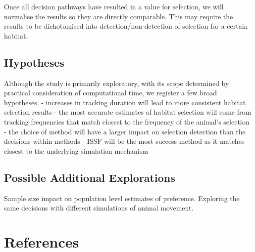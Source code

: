 \documentclass[10pt,a4paper]{article}
\begin{document}
Once all decision pathways have resulted in a value for selection, we will normalise the results so they are directly comparable.
This may require the results to be dichotomised into detection/non-detection of selection for a certain habitat.

\hypertarget{hypotheses}{%
\subsection{Hypotheses}\label{hypotheses}}

Although the study is primarily exploratory, with its scope determined by practical consideration of computational time, we register a few broad hypotheses.
- increases in tracking duration will lead to more consistent habitat selection results
- the most accurate estimates of habitat selection will come from tracking frequencies that match closest to the frequency of the animal's selection
- the choice of method will have a larger impact on selection detection than the decisions within methods
- ISSF will be the most success method as it matches closest to the underlying simulation mechanism

\hypertarget{possible-additional-explorations}{%
\subsection{Possible Additional Explorations}\label{possible-additional-explorations}}

Sample size impact on population level estimates of preference.
Exploring the same decisions with different simulations of animal movement.

\hypertarget{references}{%
\section*{References}\label{references}}
\end{document}
